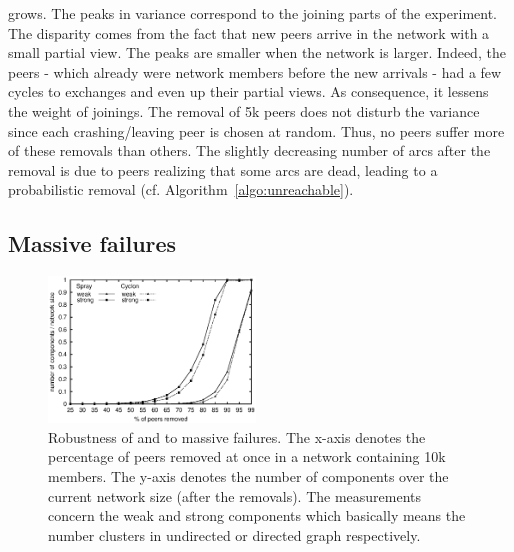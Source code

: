 \begin{asparadesc}
  grows.  The peaks in variance correspond to the joining parts of the
  experiment. The disparity comes from the fact that new peers arrive in the
  network with a small partial view. The peaks are smaller when the network is
  larger. Indeed, the peers - which already were network members before the new
  arrivals - had a few cycles to exchanges and even up their partial views. As
  consequence, it lessens the weight of joinings. The removal of 5k peers does
  not disturb the variance since each crashing/leaving peer is chosen at
  random. Thus, no peers suffer more of these removals than others. The
  slightly decreasing number of arcs after the removal is due to peers
  realizing that some arcs are dead, leading to a probabilistic removal
  (cf. Algorithm~\ref{algo:unreachable}).
\end{asparadesc}

\subsection{Massive failures}
\label{subsec:resilience}

\begin{figure}
  \centering
  \includegraphics[width=0.49\textwidth]{img/resilience.eps}
  \caption{\label{fig:resilience}Robustness of \CYCLON and \SPRAY to massive
    failures. The x-axis denotes the percentage of peers removed at once in a
    network containing 10k members. The y-axis denotes the number of
    components over the current network size (after the removals). The
    measurements concern the weak and strong components which basically means
    the number clusters in undirected or directed graph respectively.}
\end{figure}

% 

